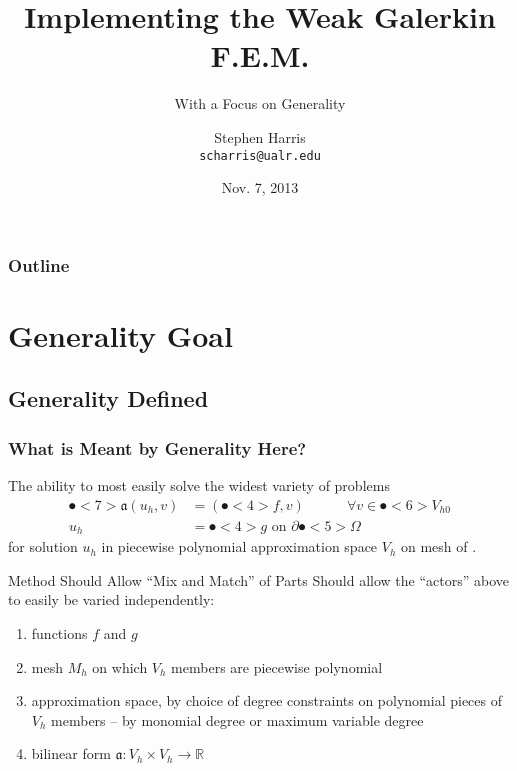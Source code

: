 \documentclass{beamer}
\title[Implementing WGFEM]{Implementing the Weak Galerkin F.E.M.}
\subtitle{With a Focus on Generality}
\author{Stephen Harris \\ \texttt{scharris@ualr.edu}}
\date{Nov. 7, 2013}
\begin{document}
\begin{frame}
  \titlepage
\end{frame}

\begin{frame}
  \frametitle{Outline}
  \tableofcontents[pausesections]
\end{frame}

\section{Generality Goal}
\subsection{Generality Defined}

\begin{frame}
  \frametitle{What is Meant by Generality Here?}
  \pause
  The ability to most easily solve the widest variety of problems
    \begin{align*}
      \spot<7>{\mathfrak{a}}(u_h,v) & = (\spot<4>{f},v)\quad\quad\quad \forall{v} \in \spot<6>{V_{h0}} \\
      u_h & = \spot<4>{g} \text{ on } \partial\spot<5>{\Omega}
    \end{align*}
    for solution $u_h$ in piecewise polynomial approximation space $V_h$ on mesh  of .
  \pause

  \begin{block}{Method Should Allow ``Mix and Match'' of Parts}
    Should allow the ``actors'' above to easily be varied independently:
    \pause
    \begin{enumerate}[<+->]
      \item functions $f$ and $g$
      \item mesh $M_h$ on which $V_h$ members are piecewise polynomial
      \item approximation space, by choice of degree constraints on polynomial pieces of $V_h$ members -- by monomial degree or maximum variable degree
      \item bilinear form $\mathfrak{a}: V_h \times V_h \rightarrow \mathbb{R}$
    \end{enumerate}
  \end{block}

\end{frame}

\end{document}
